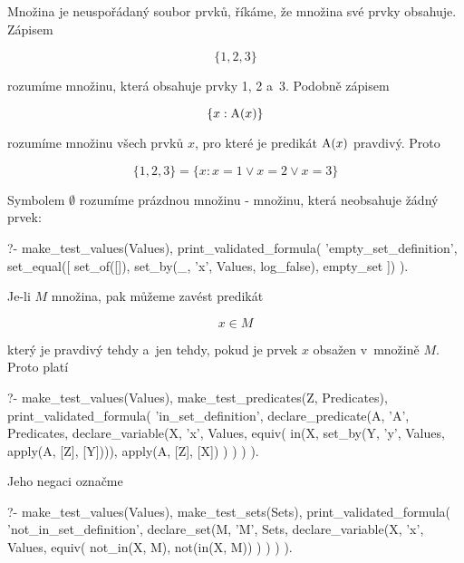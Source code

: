 Množina je neuspořádaný soubor prvků, říkáme, že množina své prvky obsahuje. Zápisem

\begin{equation}
\{1, 2, 3\}
\end{equation}

rozumíme množinu, která obsahuje prvky 1, 2 a~3. Podobně zápisem

\begin{equation}
\{x: \mathrm{A}(x)\}
\end{equation}

rozumíme množinu všech prvků \(x\), pro které je predikát \(\mathrm{A}(x)\) pravdivý. Proto

\begin{equation}
\{1, 2, 3\} = \{x: x = 1 \lor x = 2 \lor x = 3\}
\end{equation}

Symbolem \(\emptyset\) rozumíme prázdnou množinu - množinu, která neobsahuje žádný prvek:

\begin{prolog}
?-	make_test_values(Values),
	print_validated_formula(
		'empty_set_definition',
		set_equal([
			set_of([]),
			set_by(_, 'x', Values, log_false),
			empty_set
		])
	).
\end{prolog}

Je-li \(M\) množina, pak můžeme zavést predikát

\begin{equation}
x \in M
\end{equation}

který je pravdivý tehdy a~jen tehdy, pokud je prvek \(x\) obsažen v~množině \(M\). Proto platí

\begin{prolog}
?-	make_test_values(Values),
	make_test_predicates(Z, Predicates),
	print_validated_formula(
		'in_set_definition',
		declare_predicate(A, 'A', Predicates,
			declare_variable(X, 'x', Values,
				equiv(
					in(X, set_by(Y, 'y', Values, apply(A, [Z], [Y]))),
					apply(A, [Z], [X])
				)
			)
		)
	).
\end{prolog}

Jeho negaci označme

\begin{prolog}
?- 	make_test_values(Values),
	make_test_sets(Sets),
	print_validated_formula(
		'not_in_set_definition',
		declare_set(M, 'M', Sets,
			declare_variable(X, 'x', Values,
				equiv(
					not_in(X, M),
					not(in(X, M))
				)
			)
		)
	).
\end{prolog}

